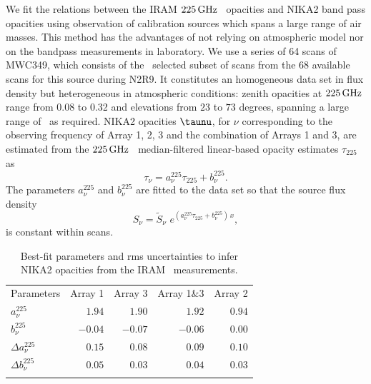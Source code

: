 We fit the relations between the IRAM
$225\,\rm{GHz}$ \taumeter\ opacities and NIKA2 band pass opacities using
observation of calibration sources which spans a large range of air
masses. This method has the advantages of not relying on atmospheric
model nor on the bandpass measurements in laboratory.
We use a series of 64 scans of MWC349, which consists of the
\baseline\ selected subset of scans from the 68 available scans for
this source during N2R9.
It constitutes an homogeneous data set in flux density but
heterogeneous in atmospheric conditions: zenith opacities at
$225\,\rm{GHz}$ range from 0.08 to 0.32 and elevations from $23$ to $73$
degrees, spanning a large range of \airmass\ as required.
NIKA2 opacities $\taunu$, for $\nu$ corresponding to the observing
frequency of Array 1, 2, 3 and the combination of Arrays 1 and 3, are estimated
from the $225\,\rm{GHz}$ \taumeter\ median-filtered linear-based opacity
estimates $\tau_{225}$ as
\begin{equation}  
  \tau_\nu =  a_\nu^{225}\tau_{225} + b_\nu^{225}.
  \label{eq:taumeter_model}
\end{equation}
The parameters $a_\nu^{225}$ and $b_\nu^{225}$ are fitted
to the data set so that the source flux density %
\begin{equation}  
  S_\nu = \tilde{S}_\nu\,\, e^{(a_\nu^{225}\tau_{225} + b_\nu^{225}) \, x}, 
  \label{eq:opacorr_taumeter}
\end{equation}
is constant within scans.

\begin{table}[!htbp]
  \begin{center}
    \caption[IRAM \taumeter\ to NIKA2 opacity model]{{\lp Best-fit
    parameters and rms uncertainties to infer NIKA2 opacities from the IRAM \taumeter\ measurements.}}
    \label{tab:tau225-to-taunika}  
    \begin{tabular}{lrrrr}
      \hline
      \hline
      \noalign{\smallskip}
      Parameters & Array 1 & Array 3  & Array 1$\&$3 & Array 2  \\
      \noalign{\smallskip}
      \hline
      \noalign{\smallskip}
      $a_\nu^{225}$         & $1.94$   &  $1.90$ &  $1.92$ & $0.94$ \\
      $b_\nu^{225}$         & $-0.04$  & $-0.07$ & $-0.06$ & $0.00$ \\
      $\Delta a_\nu^{225}$  & $0.15$  & $0.08$  &  $0.09$ & $0.10$ \\
      $\Delta b_\nu^{225}$  & $0.05$  & $0.03$  & $0.04$ & $0.03$ \\
      \noalign{\smallskip}
      \hline
    \end{tabular}
  \end{center}    
\end{table}

